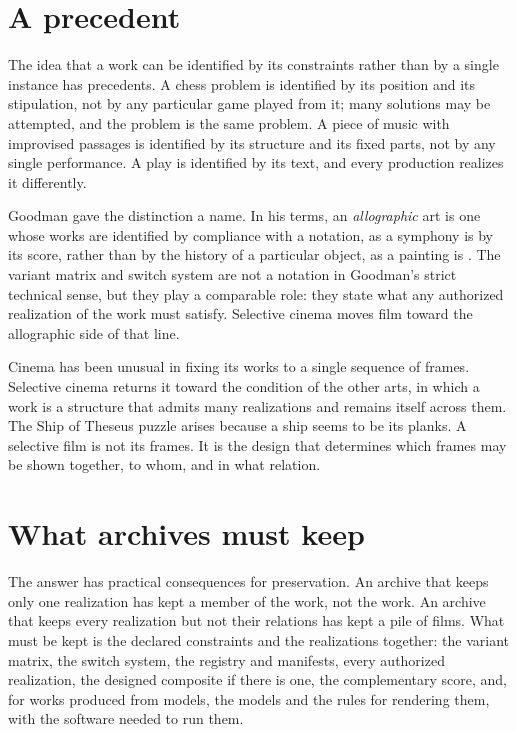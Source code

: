 \section{A precedent}

The idea that a work can be identified by its constraints rather than by a single instance has precedents. A chess problem is identified by its position and its stipulation, not by any particular game played from it; many solutions may be attempted, and the problem is the same problem. A piece of music with improvised passages is identified by its structure and its fixed parts, not by any single performance. A play is identified by its text, and every production realizes it differently.

Goodman gave the distinction a name. In his terms, an \emph{allographic} art is one whose works are identified by compliance with a notation, as a symphony is by its score, rather than by the history of a particular object, as a painting is \cite{goodman}. The variant matrix and switch system are not a notation in Goodman's strict technical sense, but they play a comparable role: they state what any authorized realization of the work must satisfy. Selective cinema moves film toward the allographic side of that line.

Cinema has been unusual in fixing its works to a single sequence of frames. Selective cinema returns it toward the condition of the other arts, in which a work is a structure that admits many realizations and remains itself across them. The Ship of Theseus puzzle arises because a ship seems to be its planks. A selective film is not its frames. It is the design that determines which frames may be shown together, to whom, and in what relation.

\section{What archives must keep}

The answer has practical consequences for preservation. An archive that keeps only one realization has kept a member of the work, not the work. An archive that keeps every realization but not their relations has kept a pile of films. What must be kept is the declared constraints and the realizations together: the variant matrix, the switch system, the registry and manifests, every authorized realization, the designed composite if there is one, the complementary score, and, for works produced from models, the models and the rules for rendering them, with the software needed to run them.

